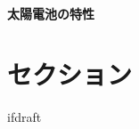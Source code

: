 \documentclass[a4paper,10pt,fleqn,uplatex]{jsarticle}
\begin{document}
\fi

\paragraph{太陽電池の特性}
\section{セクション}

\expandafter\ifx\csname ifdraft\endcsname\relax
\end{document}
